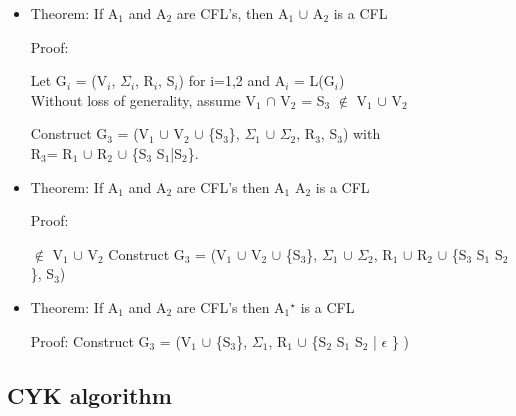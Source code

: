 \documentclass[11pt]{article}
\begin{document}
\begin{itemize}

\item Theorem: If A$_1$ and A$_2$ are CFL's, then A$_1$ $\cup$ A$_2$ is a CFL\\
\label{sec-3.7.1.1}

Proof:

    Let G$_i$ = (V$_i$, $\Sigma$$_i$, R$_i$, S$_i$) for i=1,2 and A$_i$ =
    L(G$_i$)\\
    Without loss of generality, assume V$_1$ $\cap$ V$_2$ = \emptyset \wedge
     S$_3$
    $\notin$ V$_1$ $\cup$ V$_2$
    
    Construct G$_3$ = (V$_1$ $\cup$ V$_2$ $\cup$ \{S$_3$\}, $\Sigma$$_1$ $\cup$ $\Sigma$$_2$,
    R$_3$, S$_3$) with \\
    R$_3$= R$_1$ $\cup$ R$_2$ $\cup$ \{S$_3$ \rightarrow S$_1$|S$_2$\}. \square

\item Theorem: If A$_1$ and A$_2$ are CFL's then A$_1$ \cdot A$_2$ is a CFL\\
\label{sec-3.7.1.2}

     Proof:
     
     $\notin$ V$_1$ $\cup$ V$_2$
     Construct G$_3$ = (V$_1$ $\cup$ V$_2$ $\cup$ \{S$_3$\}, $\Sigma$$_1$ $\cup$ $\Sigma$$_2$,
     R$_1$ $\cup$ R$_2$ $\cup$ \{S$_3$ \rightarrow  S$_1$ S$_2$\}, S$_3$)

\item Theorem: If A$_1$ and A$_2$ are CFL's then  A$_1$$^{\star}$ is a CFL\\
\label{sec-3.7.1.3}

     Proof:
     Construct G$_3$ = (V$_1$ $\cup$ \{S$_3$\}, $\Sigma$$_1$, R$_1$ $\cup$ \{S$_2$
     \rightarrow S$_1$ S$_2$ | $\epsilon$ \} )
\end{itemize} %
\subsection{CYK algorithm}
\label{sec-3.8}
\end{document}
